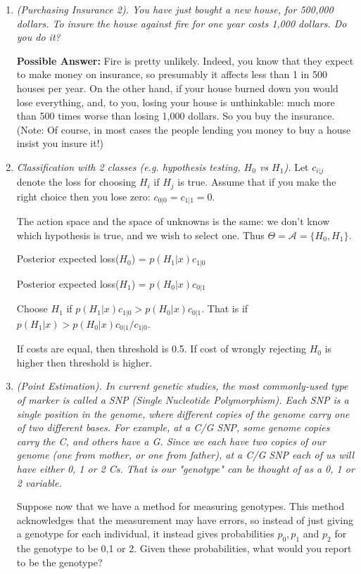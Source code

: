 \documentclass[12pt]{article}
\def\A{\mathcal A}
\begin{document}
\begin{enumerate}
\medskip

\item {\it (Purchasing Insurance 2). You have just bought a new house, for 500,000 dollars.
To insure the house against fire for one year costs 1,000 dollars. Do you do it?}

{\bf Possible Answer:}  Fire is pretty unlikely. Indeed, you know that they expect to make
money on insurance, so presumably it affects less than 1 in 500 houses per year. On the other
hand, if your house burned down you would lose everything, and, to you, 
losing your house is unthinkable: much more than 500 times worse than losing 1,000 dollars.
So you buy the insurance. (Note: Of course, in most cases the people lending you money to buy a house
insist you insure it!)

\item {\it Classification with 2 classes (e.g. hypothesis testing, $H_0$ vs $H_1$).} Let $c_{i|j}$ denote the loss for choosing $H_i$ if $H_j$ is true.
Assume that if you make the right choice then you lose zero:
$c_{0|0}=c_{1|1}=0$.

The action space and the space of unknowns is the same: we
don't know which hypothesis is true, and we wish to select one.
 Thus $\Theta=\A=\{H_0,H_1\}$.

Posterior expected loss($H_0$) = $p(H_1 | x) c_{1|0}$

Posterior expected loss($H_1$) = $p(H_0 | x) c_{0|1}$

Choose $H_1$ if $p(H_1 | x) c_{1|0} > p(H_0 | x) c_{0|1}$.
That is if $p(H_1 | x) > p(H_0 | x) c_{0|1}/c_{1|0}$.

If costs are equal, then threshold is 0.5.
If cost of wrongly rejecting $H_0$ is higher 
then threshold is higher.


\item {\it (Point Estimation). In current genetic studies, the most commonly-used type of marker is called a SNP (Single Nucleotide Polymorphism). Each SNP is a single position in the genome, where different copies of the genome carry one of two different bases. For example, at a C/G SNP, some genome copies carry the C, and others have a G. Since we each have two copies of our genome (one from mother,
or one from father), at a C/G SNP each of us will have either 0, 1 or 2 Cs. That is our "genotype" can be thought of as a 0, 1 or 2 variable.

Suppose now that we have a method for measuring genotypes. This method acknowledges
that the measurement may have errors, so instead of just giving a genotype for each individual,
it instead gives probabilities $p_0,p_1$ and $p_2$ for the genotype to be 0,1 or 2.
Given these probabilities, what would you report to be the genotype?}


\end{enumerate}
\end{document}
